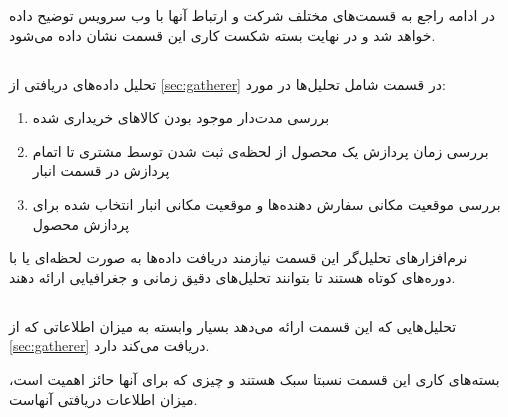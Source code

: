 در ادامه راجع به قسمت‌های مختلف شرکت و ارتباط آنها با وب سرویس توضیح داده خواهد شد و در نهایت بسته شکست کاری این قسمت نشان داده می‌شود.

\subsection{}\label{second-web-service:stock}
تحلیل‌ داده‌های دریافتی از 
\ref{sec:gatherer}
در قسمت 
شامل تحلیل‌ها در مورد:
\begin{enumerate}
\item\label{1}
بررسی مدت‌‌دار موجود بودن کالا‌های خریداری شده

\item\label{2}
بررسی زمان پردازش یک محصول از لحظه‌ی ثبت شدن توسط مشتری تا اتمام پردازش در قسمت انبار

\item\label{3}
بررسی موقعیت مکانی سفارش دهنده‌ها و موقعیت مکانی انبار انتخاب شده برای پردازش محصول

\end{enumerate}

نرم‌افزار‌های تحلیل‌گر این قسمت نیازمند دریافت داده‌ها به صورت لحظه‌ای یا با دوره‌های کوتاه هستند تا بتوانند تحلیل‌های دقیق زمانی و جغرافیایی ارائه دهند.

\subsection{}\label{second-web-service:site}

تحلیل‌هایی که این قسمت ارائه می‌دهد بسیار وابسته به میزان اطلاعاتی که از \ref{sec:gatherer} دریافت می‌کند دارد.

بسته‌های کاری این قسمت نسبتا سبک هستند و چیزی که برای آنها حائز اهمیت است، میزان اطلاعات دریافتی آنهاست.

\subsection{}

